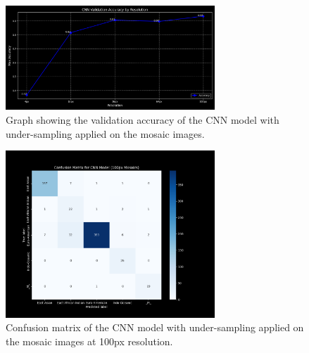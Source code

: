 \begin{appendices}
	\begin{figure}[htbp!]
		\centering
		\includegraphics[width=0.7\textwidth]{../imgs/graphs/kfold-undersample/cnn_validation_accuracy_kfold_mosaics_line_mask_5_undersample.png}
		\caption{Graph showing the validation accuracy of the CNN model with under-sampling applied on the mosaic images.}
		\label{fig:under_sampling_mosaic_accuracy}
	\end{figure}

	\begin{figure}[htbp!]
		\centering
		\includegraphics[width=0.7\textwidth]{../imgs/graphs/kfold-undersample/cnn_confusion_matrix_kfold_mosaics_100px_mask_5_undersample.png}
		\caption{Confusion matrix of the CNN model with under-sampling applied on the mosaic images at 100px resolution.}
		\label{fig:under_sampling_mosaic_confusion_matrix}
	\end{figure}



\end{appendices}
